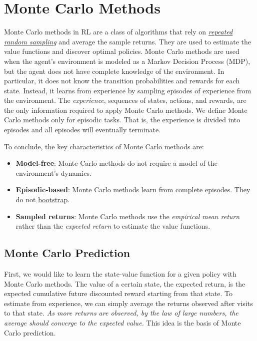 \section{Monte Carlo Methods}

Monte Carlo methods in RL are a class of algorithms that rely on \hyperref[sec:repeated-random-sampling]{\emph{repeated random sampling}} and average the sample returns. They are used to estimate the value functions and discover optimal policies. Monte Carlo methods are used when the agent's environment is modeled as a Markov Decision Process (MDP), but the agent does not have complete knowledge of the environment. In particular, it does not know the transition probabilities and rewards for each state. Instead, it learns from experience by sampling episodes of experience from the environment. The \emph{experience}, sequences of states, actions, and rewards, are the only information required to apply Monte Carlo methods. We define Monte Carlo methods only for episodic tasks. That is, the experience is divided into episodes and all episodes will eventually terminate.

To conclude, the key characteristics of Monte Carlo methods are:

\begin{itemize}
    \item \textbf{Model-free}: Monte Carlo methods do not require a model of the environment's dynamics.
    \item \textbf{Episodic-based}: Monte Carlo methods learn from complete episodes. They do not \hyperref[sec:bootstrapping]{bootstrap}.
    \item \textbf{Sampled returns}: Monte Carlo methods use the \emph{empirical mean return} rather than the \emph{expected return} to estimate the value functions.
\end{itemize}

\subsection{Monte Carlo Prediction}

First, we would like to learn the state-value function for a given policy with Monte Carlo methods. The value of a certain state, the expected return, is the expected cumulative future discounted reward starting from that state. To estimate from experience, we can simply average the returns observed after visits to that state. \emph{As more returns are observed, by the law of large numbers, the average should converge to the expected value.} This idea is the basis of Monte Carlo prediction.


